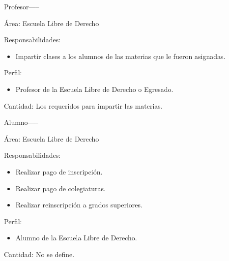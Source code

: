 \begin{actor}{Profesor}{-----}
	
	\item[Área:] Escuela Libre de Derecho
	
	\item[Responsabilidades:] \hspace{1pt}
	
	\begin{itemize}
		\item Impartir clases a los alumnos de las materias que le fueron asignadas.
	\end{itemize}
	\item[Perfil:] \hspace{1pt}
	\begin{itemize}
		\item Profesor de la Escuela Libre de Derecho o Egresado.
	\end{itemize}
	\item[Cantidad:] Los requeridos para impartir las materias.
\end{actor}


\begin{actor}{Alumno}{-----}
	
	\item[Área:] Escuela Libre de Derecho
	
	\item[Responsabilidades:] \hspace{1pt}
	
	\begin{itemize}
		\item Realizar pago de inscripción.
		\item Realizar pago de colegiaturas.
		\item Realizar reinscripción a grados superiores.
	\end{itemize}
	\item[Perfil:] \hspace{1pt}
	\begin{itemize}
		\item Alumno de la Escuela Libre de Derecho.
	\end{itemize}
	\item[Cantidad:] No se define.
\end{actor}


